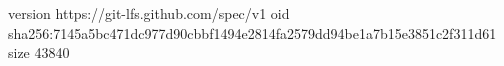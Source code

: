 version https://git-lfs.github.com/spec/v1
oid sha256:7145a5bc471dc977d90cbbf1494e2814fa2579dd94be1a7b15e3851c2f311d61
size 43840
